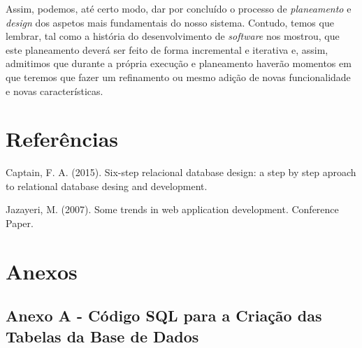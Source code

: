 \documentclass[a4paper,12pt]{report}
\begin{document}
	Assim, podemos, até certo modo, dar por concluído o processo de \textit{planeamento} e \textit{design} dos aspetos mais fundamentais do nosso sistema. Contudo, temos que lembrar, tal como a história do desenvolvimento de \textit{software} nos mostrou, que este planeamento deverá ser feito de forma incremental e iterativa e, assim, admitimos que durante a própria execução e planeamento haverão momentos em que teremos que fazer um refinamento ou mesmo adição de novas funcionalidade e novas características. 
	
	

\titleformat{\chapter}[display]
{\normalfont\bfseries}{}{0pt}{\Huge}
\chapter{Referências}

Captain, F. A. (2015). Six-step relacional database design: a step by step aproach to relational database desing and development. 

Jazayeri, M. (2007). Some trends in web application development. Conference Paper. 


\newpage
\titleformat{\chapter}[display]
{\normalfont\bfseries}{}{0pt}{\Huge}
\chapter{Anexos}

\section{Anexo A - Código SQL para a Criação das Tabelas da Base de Dados} \label{anexoA}
\end{document}
